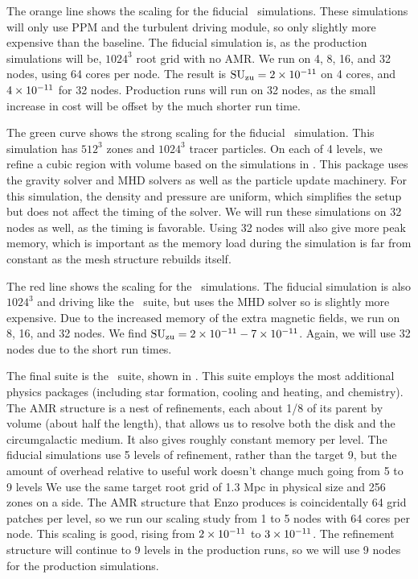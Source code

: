 \documentclass[11pt]{NSF}  %
\begin{document}
The orange line shows the scaling for the fiducial \nameTurbulence\
simulations.  These simulations will only use PPM and the turbulent driving
module, so only slightly more expensive than the baseline.  The
fiducial simulation is, as the production simulations will be, $1024^3$ root
grid with no AMR.
 We run on 4, 8, 16, and 32 nodes, using 64 cores per node.  The result is
$\rm{SU}_{\rm{zu}}=2\times {10^{-11}}$ on 4 cores, and $4\times {10^{-11}}$ for 32 nodes.  Production runs
will run on 32
nodes, as the small increase in cost will be offset by the much shorter run
time.

The green curve shows the strong scaling for the fiducial \nameCores\
simulation.  This simulation has $512^3$ zones and $1024^3$ tracer particles.
On each of 4 levels, we refine a cubic region with volume based on the simulations
in \citep{Collins12}.  This package uses the gravity solver and MHD solvers as
well as the particle update machinery.
For this simulation, the density and pressure are uniform, which simplifies the
setup but does not affect the timing of the solver.  We will run these
simulations on 32 nodes as well, as the timing is favorable. 
Using 32 nodes will also give more peak memory, which is important as the memory
load during the simulation is far from constant as the mesh structure rebuilds
itself.

The red line shows the scaling for the \nameCMB\ simulations. The fiducial
simulation is also $1024^3$ and driving like the \nameTurbulence\ suite, but uses the MHD solver so is slightly more
expensive.  Due to the increased memory of the extra magnetic fields, we run on
8, 16, and 32 nodes.  We find $\rm{SU}_{\rm{zu}}=2\times {10^{-11}}-7\times {10^{-11}}$.  
Again, we will use 32 nodes due to the short run times.

The final suite is the \nameGalaxies\ suite, shown in .  This suite
employs the most additional physics packages (including star formation,
cooling and heating, and chemistry).  The AMR structure
 is a nest of refinements, each about 1/8 of its
parent by volume (about half the length), that allows us to resolve both the disk and the circumgalactic medium.
It also gives roughly constant memory per level.
The fiducial simulations use 5 levels of refinement, rather than the target
9, but the amount of overhead relative to useful work doesn't change much going
from 5 to 9 levels  We use the same target root grid of 1.3 Mpc in physical
size and 256 zones on a side.  The AMR structure that Enzo produces is coincidentally 64 grid
patches per level, so we run our scaling study from 1 to 5 nodes with 64 cores
per node.     
This scaling is good, rising from $2\times {10^{-11}}$ to $3\times {10^{-11}}$. The refinement
structure will continue to 9 levels in the production runs, so we will use 9
nodes for the production simulations.
\end{document}
